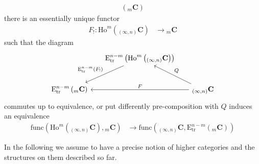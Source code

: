 \begin{itemize}
\begin{align*}
  \left(
    {_{m}}\mathbf{C}
  \right)
\end{align*}
there is an essentially unique functor
\begin{align*}
  F_{!}
  \colon
  \mathrm{Ho}^{m}
  \left(
    {_{(\infty,n)}}\mathbf{C}
  \right)
  &\to
  {_{m}}\mathbf{C}
\end{align*}
such that the diagram
\begin{equation*}
\begin{tikzcd}[row sep=2.4em,column sep=1.6em]
  &
  \mathrm{E}_{\mathrm{tr}}^{n-m}
  \left(
    \mathrm{Ho}^{m}
    \left(
      {_{(\infty,n)}}\mathbf{C}
    \right)
  \right)
  \ar{ld}[swap]{\mathrm{E}_{\mathrm{tr}}^{n-m}(F_{!})}
  &
  \\
  \mathrm{E}_{\mathrm{tr}}^{n-m}
  \left(
    {_{m}}\mathbf{C}
  \right)
  &
  &
  {_{(\infty,n)}}\mathbf{C}
  \ar{ll}[swap]{F}
  \ar{ul}[swap]{Q}
\end{tikzcd}
\end{equation*}
commutes up to equivalence, or put differently pre-composition with $Q$ induces an equivalence
\begin{align*}
  \mathrm{func}
  \left(
    \mathrm{Ho}^{m}
    \left(
      {_{(\infty,n)}}\mathbf{C}
    \right)
    ,
    {_{m}}\mathbf{C}
  \right)
  &\to
  \mathrm{func}
  \left(
    {_{(\infty,n)}}\mathbf{C}
    ,
    \mathrm{E}_{\mathrm{tr}}^{n-m}
    \left(
      {_{m}}\mathbf{C}
    \right)
  \right)
\end{align*}
\end{itemize}
In the following we assume to have a precise notion of higher categories and the structures on them described so far.
